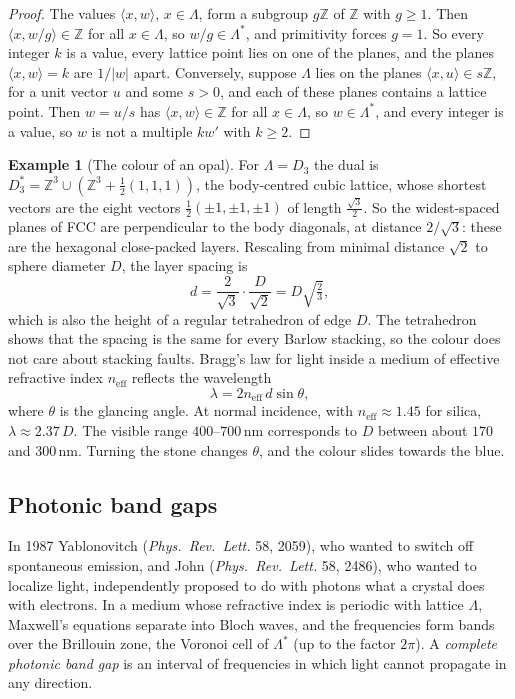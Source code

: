 \documentclass[11pt,openany]{book}
\theoremstyle{plain}
\theoremstyle{definition}
\newtheorem{example}[theorem]{Example}
\theoremstyle{remark}
\newcommand{\Z}{\mathbb{Z}}
\newcommand{\Lat}{\Lambda}             %
\newcommand{\abs}[1]{\left\lvert #1 \right\rvert}
\newcommand{\ip}[2]{\langle #1, #2\rangle}
\begin{document}
\begin{proof}
The values $\ip xw$, $x\in\Lat$, form a subgroup $g\Z$ of $\Z$ with $g\ge1$. Then $\ip x{w/g}\in\Z$ for all
$x\in\Lat$, so $w/g\in\Lat^*$, and primitivity forces $g=1$. So every integer $k$ is a value, every lattice
point lies on one of the planes, and the planes $\ip xw=k$ are $1/\abs w$ apart. Conversely, suppose $\Lat$ lies on the planes $\ip xu\in s\Z$, for a unit vector
$u$ and some $s>0$, and each of these planes contains a lattice point. Then $w=u/s$ has $\ip xw\in\Z$ for all
$x\in\Lat$, so $w\in\Lat^*$, and every integer is a value, so $w$ is not a multiple $kw'$ with $k\ge2$.
\end{proof}

\begin{example}[The colour of an opal]\label{PHYS:ex:opal}
For $\Lat=D_3$ the dual is $D_3^*=\Z^3\cup(\Z^3+\frac12(1,1,1))$, the body-centred cubic lattice, whose
shortest vectors are the eight vectors $\frac12(\pm1,\pm1,\pm1)$ of length $\frac{\sqrt3}2$. So the widest-spaced
planes of FCC are perpendicular to the body diagonals, at distance $2/\sqrt3$: these are the hexagonal
close-packed layers. Rescaling from minimal distance $\sqrt2$ to sphere diameter $D$, the layer spacing is
\[
  d=\frac{2}{\sqrt3}\cdot\frac{D}{\sqrt2}=D\sqrt{\tfrac23},
\]
which is also the height of a regular tetrahedron of edge $D$. The tetrahedron shows that the spacing
is the same for every Barlow stacking, so the colour does not care about stacking faults. Bragg's law for
light inside a medium of effective refractive index $n_{\mathrm{eff}}$ reflects the wavelength
\[
  \lambda=2n_{\mathrm{eff}}\,d\sin\theta,
\]
where $\theta$ is the glancing angle. At normal incidence, with $n_{\mathrm{eff}}\approx1.45$ for silica, $\lambda\approx2.37\,D$.
The visible range $400$--$700$\,nm corresponds to $D$ between about $170$ and $300$\,nm. Turning the stone
changes $\theta$, and the colour slides towards the blue.
\end{example}


\subsection*{Photonic band gaps}
In 1987 Yablonovitch (\emph{Phys.\ Rev.\ Lett.} 58, 2059), who wanted to switch off spontaneous emission, and
John (\emph{Phys.\ Rev.\ Lett.} 58, 2486), who wanted to localize light, independently proposed to do with
photons what a crystal does with electrons. In a medium whose refractive index is periodic with lattice
$\Lat$, Maxwell's equations separate into Bloch waves, and the frequencies form bands over the Brillouin
zone, the Voronoi cell of $\Lat^*$ (up to the factor $2\pi$). A \emph{complete photonic band gap} is an
interval of frequencies in which light cannot propagate in any direction.
\end{document}
